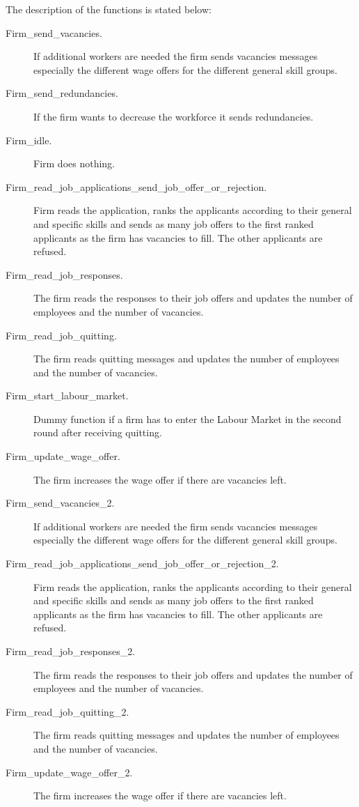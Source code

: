 The description of the functions is stated below:
\begin{description}
\item[Firm\_send\_vacancies.] If additional workers are needed the firm sends
vacancies messages
 especially the different wage offers for the different general skill groups.
\item[Firm\_send\_redundancies.] If the firm wants to
decrease the workforce it sends redundancies.
\item[Firm\_idle.] Firm does nothing.
\item[Firm\_read\_job\_applications\_send\_job\_offer\_or\_rejection.] Firm reads the application, ranks the
applicants according to their general and specific skills and sends
as many job offers to the first ranked applicants as the firm has
vacancies to fill. The other applicants are refused.
\item[Firm\_read\_job\_responses.] The firm reads
the responses to their job offers and updates the number of
employees and the number of vacancies.
\item[Firm\_read\_job\_quitting.] The firm reads quitting messages and updates the number
of employees and the number of vacancies.
\item[Firm\_start\_labour\_market.] Dummy function if a firm has to enter the Labour Market
in the second round after receiving quitting.
\item[Firm\_update\_wage\_offer.] The firm increases the wage offer if there are vacancies
 left.
\item[Firm\_send\_vacancies\_2.] If additional workers are needed the firm sends vacancies messages
 especially the different wage offers for the different general skill groups.
\item[Firm\_read\_job\_applications\_send\_job\_offer\_or\_rejection\_2.]
Firm reads the application, ranks the applicants according to their
general and specific skills and sends as many job offers to the
first ranked applicants as the firm has vacancies to fill. The other
applicants are refused.
\item[Firm\_read\_job\_responses\_2.] The firm
reads the responses to their job offers and updates the number of
employees and the number of vacancies.
\item[Firm\_read\_job\_quitting\_2.] The firm reads quitting messages and updates the number
of employees and the number of vacancies.
\item[Firm\_update\_wage\_offer\_2.] The
firm increases the wage offer if there are vacancies left.

\end{description}

